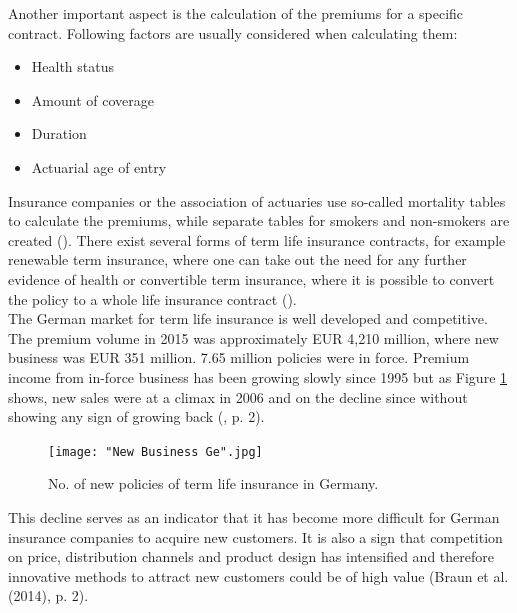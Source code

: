 \documentclass[12pt, abstracton]{article}
\begin{document}
Another important aspect is the calculation of the premiums for a specific contract. Following factors are usually considered when calculating them:
 \begin{itemize}
 \item Health status
 \item Amount of coverage
 \item	Duration
 \item	Actuarial age of entry
\end{itemize}
Insurance companies or the association of actuaries use so-called mortality tables to calculate the premiums, while separate tables for smokers and non-smokers are created (\cite{GDV2017}). There exist several forms of term life insurance contracts, for example renewable term insurance, where one can take out the need for any further evidence of health or convertible term insurance, where it is possible to convert the policy to a whole life insurance contract (\cite{ABI2017}).\\
The German market for term life insurance is well developed and competitive. The premium volume in 2015 was approximately EUR 4,210 million, where new business was EUR 351 million. 7.65 million policies were in force. Premium income from in-force business has been growing slowly since 1995 but as Figure \ref{fig:PolicyGE} shows, new sales were at a climax in 2006 and on the decline since without showing any sign of growing back (\cite{Braun2014}, p. 2).
\begin{figure}[H]
	\texttt{[image: "New Business Ge".jpg]}
	\caption{No. of new policies of term life insurance in Germany.}
	\label{fig:PolicyGE}	
\end{figure}
This decline serves as an indicator that it has become more difficult for German insurance companies to acquire new customers. It is also a sign that competition on price, distribution channels and product design has intensified and therefore innovative methods to attract new customers could be of high value (Braun et al. (2014), p. 2).
\end{document}
